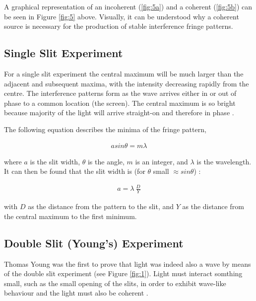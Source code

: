 \documentclass[12pt]{article}
\begin{document}
A graphical representation of an incoherent (\ref{fig:5a}) and a coherent (\ref{fig:5b}) can be seen in Figure \ref{fig:5} above. Visually, it can be understood why a coherent
source is necessary for the production of stable interference fringe patterns.

\subsection{Single Slit Experiment} \label{sec:1.4}

For a single slit experiment the central maximum will be much larger than the adjacent and subsequent maxima, with the intensity decreasing rapidly from the centre. The interference patterns form
as the wave arrives either in or out of phase to a common location (the screen). The central maximum is so bright because majority of the light will arrive straight-on and therefore in phase \cite{urone2012collegesingle}.

The following equation describes the minima of the fringe pattern,

\vspace{-2ex} \label{eq:1}
\begin{gather}
    a sin \theta = m \lambda
\end{gather}

where $a$ is the slit width, $\theta$ is the angle, $m$ is an integer, and $\lambda$ is the wavelength. It can then be found that the slit width is (for $\theta$ small $\approx sin \theta$) \cite{UCDinterference}:

\vspace{-2ex}
\begin{gather} \label{eq:2}
    a = \lambda \: \frac{D}{Y}
\end{gather}

with $D$ as the distance from the pattern to the slit, and $Y$ as the distance from the central maximum to the first minimum.

\subsection{Double Slit (Young's) Experiment} \label{sec:1.5}

Thomas Young was the first to prove that light was indeed also a wave by means of the double slit experiment (see Figure \ref{fig:1}). Light must interact somthing small, such as the small opening of the slits, in order to
exhibit wave-like behaviour and the light must also be coherent \cite{urone2012collegedouble}.
\end{document}
